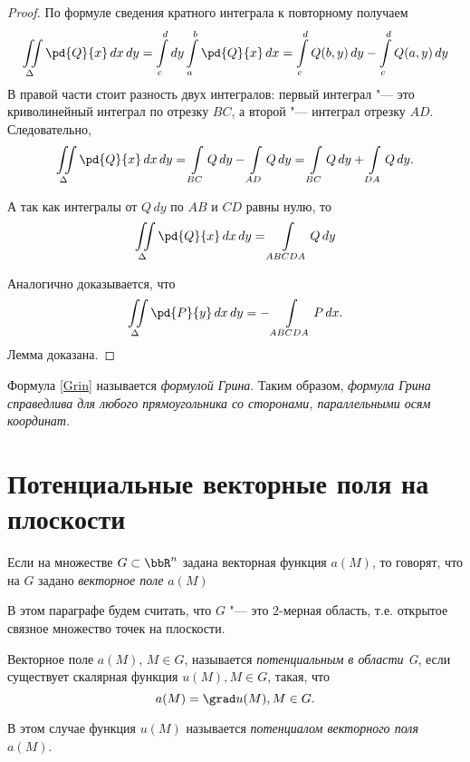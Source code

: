 \begin{proof}
По формуле сведения кратного интеграла к повторному получаем
$$
\iint\limits_{\Delta} \pd{Q}{x} \,dx\,dy = \int_{c}^{d}\limits dy \int_a^b\limits \pd{Q}{x}\,dx = \int_c^d\limits Q(b,y)\,dy - \int_c^d\limits Q(a,y)\,dy
$$
В правой части стоит разность двух интегралов: первый интеграл "--- это криволинейный интеграл по отрезку $BC$, а второй "--- интеграл отрезку $AD$. Следовательно,
$$
\iint\limits_\Delta\pd{Q}{x}\,dx\,dy = \int_{BC}\limits Q\,dy - \int_{AD}\limits Q\,dy = \int_{BC}\limits Q\,dy + \int_{DA}\limits Q\,dy.
$$

А так как интегралы от $Q\,dy$ по $AB$ и $CD$ равны нулю, то
$$
\iint\limits_\Delta\pd{Q}{x}\,dx\,dy = \int\limits_{ABCDA} Q\,dy
$$

Аналогично доказывается, что
$$
\iint\limits_\Delta\pd{P}{y}\,dx\,dy = -\int\limits_{ABCDA} P\,dx.  
$$
\noindent
Лемма доказана.
\end{proof}
Формула \eqref{Grin} называется \textit{формулой Грина}. Таким образом, \textit{формула Грина справедлива для любого прямоугольника со сторонами, параллельными осям координат}.


\section{Потенциальные векторные поля на плоскости}

Если на множестве $G \subset \bbR^n$ задана векторная функция $a(M)$, то говорят, что на $G$ задано \textit{векторное поле} $a(M)$ 

В этом параграфе будем считать, что $G$ "--- это $2$-мерная область, т.е. открытое связное множество точек на плоскости.

\begin{defn}
Векторное поле $a(M)$, $M\in G$, называется \textit{потенциальным в области G}, если существует скалярная функция $u(M), M\in G$, такая, что 
$$
a(M) = \grad u(M), M \in G.
$$

В этом случае функция $u(M)$ называется \textit{потенциалом векторного поля} $a(M)$.
\end{defn}